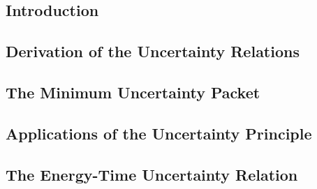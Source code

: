 \subsection{Introduction}

\subsection{Derivation of the Uncertainty Relations}

\subsection{The Minimum Uncertainty Packet}

\subsection{Applications of the Uncertainty Principle}

\subsection{The Energy-Time Uncertainty Relation}

